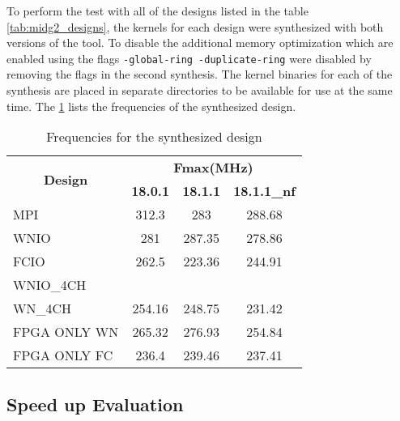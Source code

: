 To perform the test with all of the designs listed in the table \ref{tab:midg2_designs},
the kernels for each design were synthesized with both versions of the tool. To disable
the additional memory optimization which are enabled using the flags \texttt{-global-ring -duplicate-ring}
were disabled by removing the flags in the second synthesis. The kernel binaries for each
of the synthesis are placed in separate directories to be available for use at the same time.
The \ref{tab:syn_freq} lists the frequencies of the synthesized design.

\begin{table}[ht]
    \centering
    \caption{Frequencies for the synthesized design }
    \label{tab:syn_freq}
    \begin{tabular}{lccc}
    \multicolumn{1}{c}{\multirow{2}{*}{\textbf{Design}}} & \multicolumn{3}{c}{\textbf{Fmax(MHz)}} \\
    \cline{2-4}
    \multicolumn{1}{c}{} & \textbf{18.0.1} & \textbf{18.1.1} & \textbf{18.1.1\_nf} \\
    \hline
    MPI & 312.3 & 283 & 288.68 \\
    WNIO & 281 & 287.35 & 278.86 \\
    FCIO & 262.5 & 223.36 & 244.91 \\
    WNIO\_4CH &  &  &  \\
    WN\_4CH & 254.16 & 248.75 & 231.42 \\
    FPGA ONLY WN & 265.32 & 276.93 & 254.84 \\
    FPGA ONLY FC & 236.4 & 239.46 & 237.41
    \end{tabular}%
\end{table}


\subsection{Speed up Evaluation}


